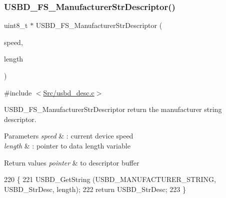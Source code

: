 \subsubsection{\texorpdfstring{U\+S\+B\+D\+\_\+\+F\+S\+\_\+\+Manufacturer\+Str\+Descriptor()}{USBD\_FS\_ManufacturerStrDescriptor()}}
{\footnotesize\ttfamily uint8\+\_\+t $\ast$ U\+S\+B\+D\+\_\+\+F\+S\+\_\+\+Manufacturer\+Str\+Descriptor (\begin{DoxyParamCaption}\item[{U\+S\+B\+D\+\_\+\+Speed\+Type\+Def}]{speed,  }\item[{uint16\+\_\+t $\ast$}]{length }\end{DoxyParamCaption})}



{\ttfamily \#include $<$\mbox{\hyperlink{usbd__desc_8c}{Src/usbd\+\_\+desc.\+c}}$>$}



U\+S\+B\+D\+\_\+\+F\+S\+\_\+\+Manufacturer\+Str\+Descriptor return the manufacturer string descriptor. 


\begin{DoxyParams}{Parameters}
{\em speed} & \+: current device speed \\
\hline
{\em length} & \+: pointer to data length variable \\
\hline
\end{DoxyParams}

\begin{DoxyRetVals}{Return values}
{\em pointer} & to descriptor buffer \\
\hline
\end{DoxyRetVals}

\begin{DoxyCode}
220 \{
221   USBD\_GetString (USBD\_MANUFACTURER\_STRING, USBD\_StrDesc, length);
222   \textcolor{keywordflow}{return} USBD\_StrDesc;
223 \}
\end{DoxyCode}
\mbox{\label{group___u_s_b_d___d_e_s_c___private___functions_ga0ec558c0303daabb851d584109a56514}} 
